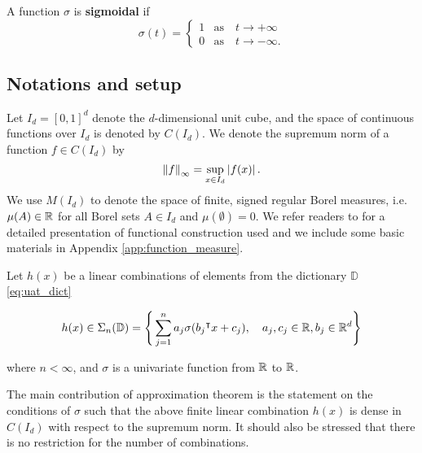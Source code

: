 
\begin{definition}\label{def:sigmoidal}
    A function $\sigma$ is \textbf{sigmoidal} if
    \begin{equation}
        \sigma(t) =
        \begin{cases}
            1 & \text{as} \quad t \to +\infty \\
            0 & \text{as} \quad t \to -\infty.
        \end{cases}
    \end{equation}
\end{definition}

\subsection*{Notations and setup}

Let $I_d = [0,1]^d$ denote the $d$-dimensional unit cube, and the space of
continuous functions over $I_d$ is denoted by $C(I_d)$. We denote the supremum
norm of a function $f \in C(I_d)$ by
\begin{equation}
    \label{def:sup_norm}
    \left\| f \right\|_{\infty} = \sup_{x\in I_d} \left| f(x) \right|.
\end{equation}
We use $M(I_d)$ to denote the space of finite, signed regular Borel measures,
i.e. $\mu(A) \in \mathbb{R}$ for all Borel sets $A \in I_d$ and $\mu(\emptyset)= 0$. We
refer readers to \cite{rudinFunctionalAnalysis1991,
rudinRealComplexAnalysis1987} for a detailed presentation of functional
construction used and we include some basic materials in Appendix
\ref{app:function_measure}.

Let $h(x)$ be a linear combinations of elements from the dictionary $\mathbb{D}$
\eqref{eq:uat_dict}

\begin{align}
    \label{eq:sum_sigma}
    h(x) \in 
    \Sigma_n(\mathbb{D}) = \Bigg\{
        \sum_{j=1}^n a_j \sigma(b_j{}^{\intercal} x + c_j), \quad
        a_j, c_j \in \mathbb{R},  b_j \in \mathbb{R}^d
    \Bigg\}
\end{align}

where  $n < \infty$, and $\sigma$ is a univariate function from $\mathbb{R}$ to $\mathbb{R}$.
 
The main contribution of approximation theorem is the statement on the
conditions of $\sigma$ such that the above finite linear combination $h(x)$ is
dense in $C(I_d)$ with respect to the supremum norm. It should also be stressed
that there is no restriction for the number of combinations.

